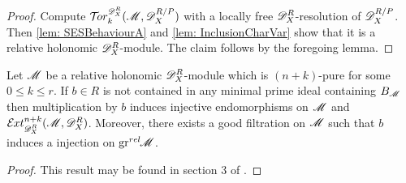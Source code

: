 \begin{proof}
  Compute $\Tr{\D_X^R}{k}(\M, \D_X^{R/P})$ with a locally free $\mathscr{D}_X^R$-resolution of $\mathscr{D}_X^{R/P}$.
  Then \cref{lem: SESBehaviourA} and \cref{lem: InclusionCharVar} show that it is a relative holonomic $\mathscr{D}_X^R$-module.
  The claim follows by the foregoing lemma.
\end{proof}
\begin{lemma}\label{lem: NotBernsteinInjectiveAutomorphism}
  Let $\mathscr{M}$ be a relative holonomic $\mathscr{D}_X^R$-module which is $(n+k)$-pure for some $0\leq k \leq r$. If $b\in R$ is not contained in any minimal prime ideal containing $B_{\mathscr{M}}$ then multiplication by $b$ induces injective endomorphisms on $\mathscr{M}$ and $\Ex{\D_X^R}{n+k}(\M,\D_X^R)$. Moreover, there exists a good filtration on $\mathscr{M}$ such that $b$ induces a injection on $\operatorname{gr}^{rel}\mkern-5mu \mathscr{M}$.
\end{lemma}
\begin{proof}
  This result may be found in section 3 of \cite{budur2019zero}.
\end{proof}
